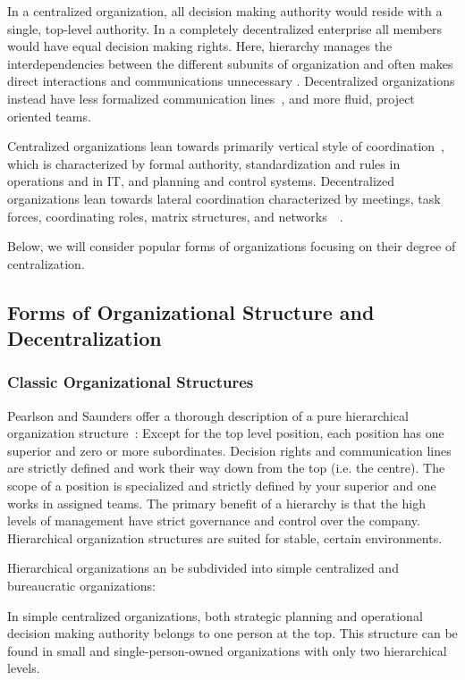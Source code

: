 In a centralized organization, all decision making authority would reside with a single, top-level authority. In a completely decentralized enterprise all members would have equal decision making rights. Here, hierarchy manages the interdependencies between the different subunits of organization and often makes direct interactions and communications unnecessary \cite{thompson1967}.  Decentralized organizations instead have less formalized communication lines~\cite{pearlson2009}, and more fluid, project oriented teams.~\cite{applegate1988}

Centralized organizations lean towards primarily vertical style of coordination~\cite{Bolman2008}, which is characterized by formal authority, standardization and rules in operations and in IT, and planning and control systems. Decentralized organizations lean towards lateral coordination characterized by meetings, task forces, coordinating roles, matrix structures, and networks~~\cite{Bolman2008}. 

Below, we will consider popular forms of organizations focusing on their degree of centralization. 

\subsection{Forms of Organizational Structure and Decentralization}

\subsubsection{Classic Organizational Structures}

Pearlson and Saunders offer a thorough description of a pure hierarchical organization structure~\cite{pearlson2009}: Except for the top level position, each position has one superior and zero or more subordinates. Decision rights and communication lines are strictly defined and work their way down from the top (i.e. the centre). The scope of a position is specialized and strictly defined by your superior and one works in assigned teams. The primary benefit of a hierarchy is that the high levels of management have strict governance and control over the company. Hierarchical organization structures are suited for stable, certain environments. 

Hierarchical organizations an be subdivided into simple centralized and bureaucratic organizations:

In simple centralized organizations, both strategic planning and operational decision making authority belongs to one person at the top. This structure can be found in small and single-person-owned organizations with only two hierarchical levels. 

